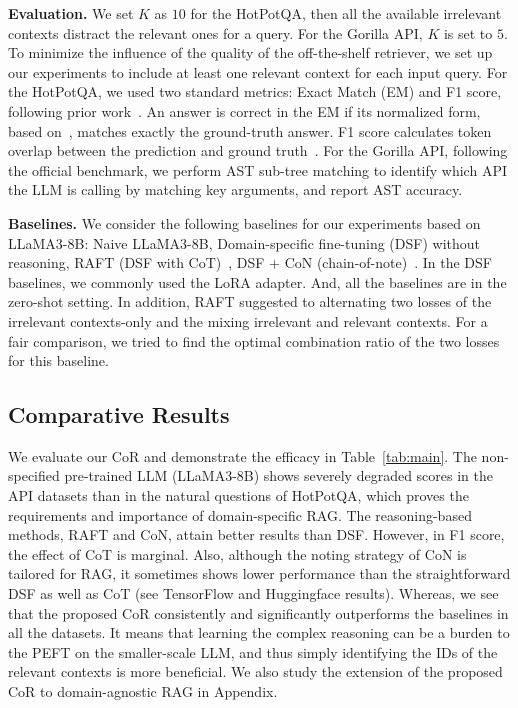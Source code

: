 \noindent \textbf{Evaluation.} We set $K$ as $10$ for the HotPotQA, then all the available irrelevant contexts distract the relevant ones for a query. For the Gorilla API, $K$ is set to $5$. To minimize the influence of the quality of the off-the-shelf retriever, we set up our experiments to include at least one relevant context for each input query. 
For the HotPotQA, we used two standard metrics: Exact Match (EM) and F1 score, following prior work~\cite{chen1704reading,karpukhin2020dense,zhu2021retrieving}. An answer is correct in the EM if its normalized form, based on~\citep{karpukhin2020dense}, matches exactly the ground-truth answer. F1 score calculates token overlap between the prediction and ground truth~\cite{zhu2021retrieving}. For the Gorilla API, following the official benchmark, we perform AST sub-tree matching to identify which API the LLM is calling by matching key arguments, and report AST accuracy.

\noindent \textbf{Baselines.} 
We consider the following baselines for our experiments based on LLaMA3-8B: Naive LLaMA3-8B, Domain-specific fine-tuning (DSF) without reasoning, RAFT (DSF with CoT)~\cite{RAFT}, DSF + CoN (chain-of-note)~\cite{con}. In the DSF baselines, we commonly used the LoRA adapter. And, all the baselines are in the zero-shot setting. In addition, RAFT suggested to alternating two losses of the irrelevant contexts-only and the mixing irrelevant and relevant contexts. For a fair comparison, we tried to find the optimal combination ratio of the two losses for this baseline. 






\subsection{Comparative Results}
\vspace{-0.2cm}
We evaluate our CoR and demonstrate the efficacy in Table~\ref{tab:main}. The non-specified pre-trained LLM (LLaMA3-8B) shows severely degraded scores in the API datasets than in the natural questions of HotPotQA, which proves the requirements and importance of domain-specific RAG. The reasoning-based methods, RAFT and CoN, attain better results than DSF. However, in F1 score, the effect of CoT is marginal. Also, although the noting strategy of CoN is tailored for RAG, it sometimes shows lower performance than the straightforward DSF as well as CoT (see TensorFlow and Huggingface results). Whereas, we see that the proposed CoR consistently and significantly outperforms the baselines in all the datasets. It means that learning the complex reasoning can be a burden to the PEFT on the smaller-scale LLM, and thus simply identifying the IDs of the relevant contexts is more beneficial.
We also study the extension of the proposed CoR to domain-agnostic RAG in Appendix. 



